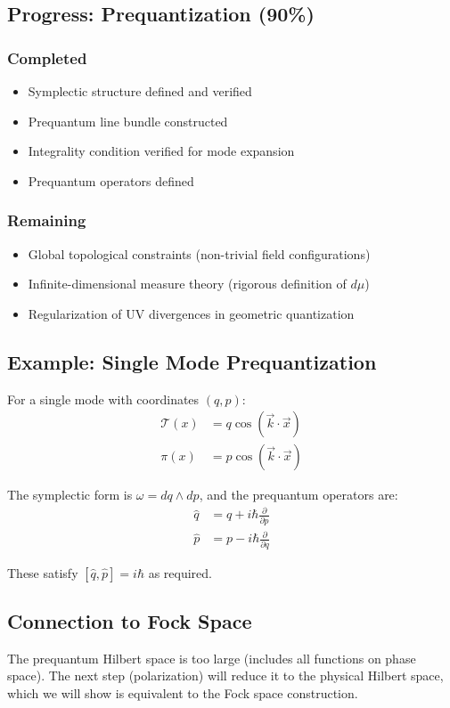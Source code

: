 \subsection{Progress: Prequantization (90\%)}

\subsubsection{Completed}
\begin{itemize}
    \item Symplectic structure defined and verified
    \item Prequantum line bundle constructed
    \item Integrality condition verified for mode expansion
    \item Prequantum operators defined
\end{itemize}

\subsubsection{Remaining}
\begin{itemize}
    \item Global topological constraints (non-trivial field configurations)
    \item Infinite-dimensional measure theory (rigorous definition of $d\mu$)
    \item Regularization of UV divergences in geometric quantization
\end{itemize}

\subsection{Example: Single Mode Prequantization}

For a single mode with coordinates $(q, p)$:
\begin{align}
    \mathcal{T}(x) &= q \cos(\vec{k} \cdot \vec{x}) \\
    \pi(x) &= p \cos(\vec{k} \cdot \vec{x})
\end{align}

The symplectic form is $\omega = dq \wedge dp$, and the prequantum operators are:
\begin{align}
    \hat{q} &= q + i\hbar \frac{\partial}{\partial p} \\
    \hat{p} &= p - i\hbar \frac{\partial}{\partial q}
\end{align}

These satisfy $[\hat{q}, \hat{p}] = i\hbar$ as required.

\subsection{Connection to Fock Space}

The prequantum Hilbert space is too large (includes all functions on phase space). The next step (polarization) will reduce it to the physical Hilbert space, which we will show is equivalent to the Fock space construction.
